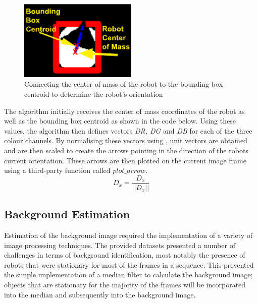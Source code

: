 \documentclass{article}
\begin{document}
\begin{figure}[h!]
	\centering
		\includegraphics[width=0.5\textwidth]{../Drawings/orientationAlgorithm.pdf}
	\caption{Connecting the center of mass of the robot to the bounding box centroid to determine the robot's orientation}
	\label{fig:orientation}
\end{figure}

The algorithm initially receives the center of mass coordinates of the robot as well as the bounding box centroid as shown in the code below. Using these values, the algorithm then defines vectors \textit{DR, DG} and \textit{DB} for each of the three colour channels. By normalising these vectors using , unit vectors are obtained and are then scaled to create the arrows pointing in the direction of the robots current orientation. These arrows are then plotted on the current image frame using a third-party function called \textit{$plot\_arrow$}.\\

\begin{equation}
D_{x} = \frac{D_{x}}{\vert\vert D_{x} \vert\vert}
\label{eqn:norm}
\end{equation}



\subsection{Background Estimation}
\label{sec:back}
Estimation of the background image required the implementation of a variety of image processing techniques. The provided datasets presented a number of challenges in terms of background identification, most notably the presence of robots that were stationary for most of the frames in a sequence. This prevented the simple implementation of a median filter to calculate the background image; objects that are stationary for the majority of the frames will be incorporated into the median and subsequently into the background image.\\
\end{document}
